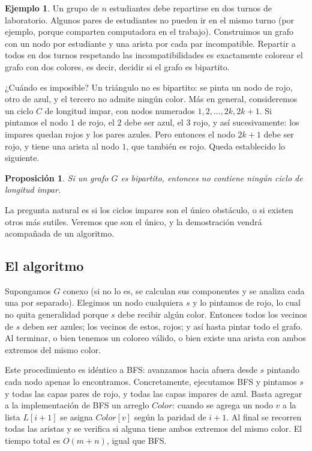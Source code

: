 \documentclass[12pt, spanish, oneside, openany]{book}
\theoremstyle{uprightplain}
\newtheorem{proposicion}[teorema]{Proposición}
\theoremstyle{definition}
\newtheorem{ejemplo}[teorema]{Ejemplo}
\theoremstyle{remark}
\theoremstyle{definition}
\begin{document}
\begin{ejemplo}
\label{ej:bipartito-turnos}
Un grupo de $n$ estudiantes debe repartirse en dos turnos de laboratorio. Algunos pares de estudiantes no pueden ir en el mismo turno (por ejemplo, porque comparten computadora en el trabajo). Construimos un grafo con un nodo por estudiante y una arista por cada par incompatible. Repartir a todos en dos turnos respetando las incompatibilidades es exactamente colorear el grafo con dos colores, es decir, decidir si el grafo es bipartito.
\end{ejemplo}

¿Cuándo es imposible? Un triángulo no es bipartito: se pinta un nodo de rojo, otro de azul, y el tercero no admite ningún color. Más en general, consideremos un ciclo $C$ de longitud impar, con nodos numerados $1,2,\dots,2k,2k+1$. Si pintamos el nodo $1$ de rojo, el $2$ debe ser azul, el $3$ rojo, y así sucesivamente: los impares quedan rojos y los pares azules. Pero entonces el nodo $2k+1$ debe ser rojo, y tiene una arista al nodo $1$, que también es rojo. Queda establecido lo siguiente.

\begin{proposicion}
\label{prop:bipartito-ciclo-impar}
Si un grafo $G$ es bipartito, entonces no contiene ningún ciclo de longitud impar.
\end{proposicion}

La pregunta natural es si los ciclos impares son el único obstáculo, o si existen otros más sutiles. Veremos que son el único, y la demostración vendrá acompañada de un algoritmo.

\subsection{El algoritmo}

Supongamos $G$ conexo (si no lo es, se calculan sus componentes y se analiza cada una por separado). Elegimos un nodo cualquiera $s$ y lo pintamos de rojo, lo cual no quita generalidad porque $s$ debe recibir algún color. Entonces todos los vecinos de $s$ deben ser azules; los vecinos de estos, rojos; y así hasta pintar todo el grafo. Al terminar, o bien tenemos un coloreo válido, o bien existe una arista con ambos extremos del mismo color.

Este procedimiento es idéntico a BFS: avanzamos hacia afuera desde $s$ pintando cada nodo apenas lo encontramos. Concretamente, ejecutamos BFS y pintamos $s$ y todas las capas pares de rojo, y todas las capas impares de azul. Basta agregar a la implementación de BFS un arreglo $\mathit{Color}$: cuando se agrega un nodo $v$ a la lista $L[i+1]$ se asigna $\mathit{Color}[v]$ según la paridad de $i+1$. Al final se recorren todas las aristas y se verifica si alguna tiene ambos extremos del mismo color. El tiempo total es $O(m+n)$, igual que BFS.
\end{document}
